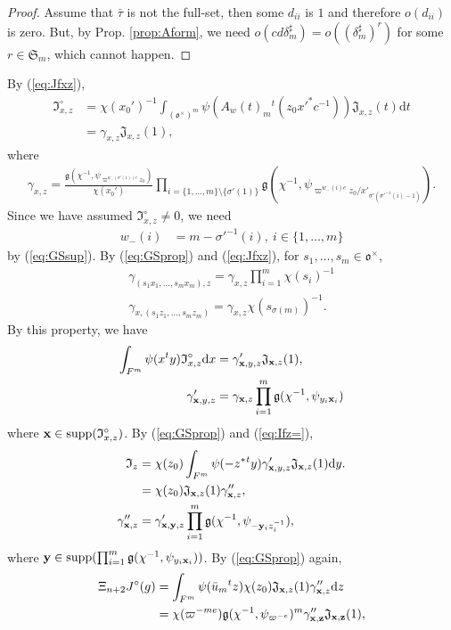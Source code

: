 \documentclass[11pt]{amsart}
\newcommand\s{\sigma}%
\newcommand\Vp{\varpi}%
\newcommand\vp{\varphi}%
\newcommand\oo{\mathfrak{o}}
\newcommand\Sf{{\mathfrak{S}}}
\newcommand\If{\mathfrak{I}}
\newcommand\Jf{\mathfrak{J}}
\newcommand\gf{\mathfrak{g}}
\newcommand\dr{\mathrm{d}}
\newcommand\xb{{\bold{x}}}
\newcommand\yb{{\bold{y}}}
\newcommand\zb{{\bold{z}}}
\newcommand\1{\mathbf{1}}
\newcommand\nid{\noindent}
\newcommand\tm{\times}
\newcommand\supp{{\mathrm{supp}}}%
\newcommand\bu{\bar{u}}
\numberwithin{equation}{section}
\begin{document}
\begin{proof}
Assume that $\bar{\tau}$ is not the full-set, then some $d_{ii}$ is $1$ and therefore $o(d_{ii})$ is zero.
But, by Prop. \ref{prop:Aform}, we need $o(cd \delta_m^\sharp) = o((\delta_m^\sharp)^{r})$ for some $r \in \Sf_m$, which cannot happen.
\end{proof}
\nid
By (\ref{eq:Jfxz}),  
\begin{align*}
\If_{x,z}^\circ &= \chi(x_0')^{-1} \int_{(\oo^\tm)^m} \psi(A_w(t)_m {}^t(z_0 x'^*c^{-1})) \Jf_{x,z}(t) \dr t \\
&= \gamma_{x,z} \Jf_{x,z}(1),
\end{align*} 
where 
\begin{align*}
\gamma_{x,z} = \frac{\gf(\chi^{-1},\psi_{\Vp^{w_-(\s'(1))e}z_0})}{\chi(x_0')}\prod_{i = \{1, \ldots,m \} \setminus \{\s'(1)\}} \gf\left(\chi^{-1}, \psi_{\Vp^{w_-(i)e}z_0/x'_{\s'(\s'^{-1}(i) -1)}} \right).
\end{align*} 
Since we have assumed $\If_{x,z}^\circ \neq 0$, we need 
\begin{align*}
w_-(i) &= m -\s'^{-1}(i), \  i \in \{1,\ldots, m \}
\end{align*} 
by (\ref{eq:GSsup}).
By (\ref{eq:GSprop}) and (\ref{eq:Jfxz}), for $s_1, \ldots, s_m \in \oo^\tm$, 
\begin{align*}
\gamma_{(s_1x_1, \ldots, s_mx_m),z} = \gamma_{x,z}\prod_{i=1}^m \chi(s_i)^{-1} \\
\gamma_{x,(s_1z_1, \ldots, s_mz_m)} = \gamma_{x,z}\chi(s_{\s(m)})^{-1}.
\end{align*} 
By this property, we have
\begin{align*}
\int_{F^m} \psi(x{}^ty) \If_{x,z}^\circ \dr x &= \gamma_{\xb,y,z}' \Jf_{\xb,z}(1), \\
\gamma_{\xb,y,z}' &= \gamma_{\xb,z} \prod_{i=1}^m \gf(\chi^{-1},\psi_{y_i \xb_i})
\end{align*} 
where $\xb \in \supp(\If_{x,z}^\circ)$. 
By (\ref{eq:GSprop}) and (\ref{eq:Ifz=}),
\begin{align*}
\If_z &= \chi(z_0) \int_{F^m} \psi(-z^*{}^ty)\gamma_{\xb,y,z}' \Jf_{\xb,z}(1) \dr y.\\
&= \chi(z_0) \Jf_{\xb,z}(1) \gamma''_{\xb,z}, \\
\gamma''_{\xb,z} &= \gamma_{\xb, \yb,z}' \prod_{i=1}^m \gf(\chi^{-1},\psi_{-\yb_iz_i^{-1}}),
\end{align*}  
where $\yb \in \supp(\prod_{i=1}^m \gf(\chi^{-1},\psi_{y_i \xb_i}))$. 
By (\ref{eq:GSprop}) again,
\begin{align*}
\Xi_{n+2}J^\circ(g) &= \int_{F^m} \psi(\bu_m{}^tz) \chi(z_0) \Jf_{\xb,z}(1) \gamma''_{\xb,z} \dr z \\
&= \chi(\Vp^{-me}) \gf(\chi^{-1},\psi_{\Vp^{-e}})^m \gamma''_{\xb,\zb} \Jf_{\xb, \zb}(1),
\end{align*} 
\end{document}
